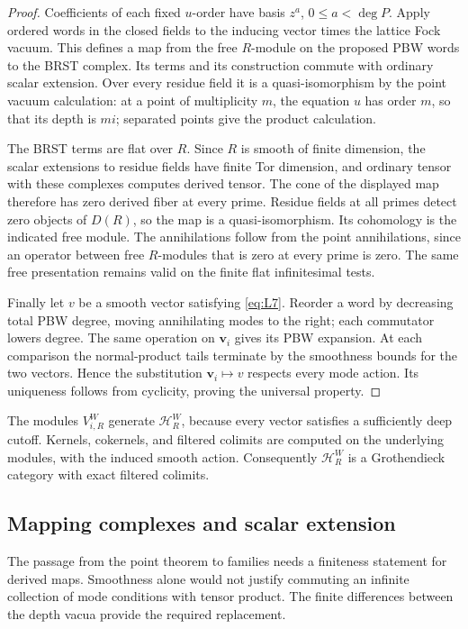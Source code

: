 \begin{proof}
Coefficients of each fixed \(u\)-order have basis
\(z^a\), \(0\leq a<\deg P\).  Apply ordered words in the closed
fields to the inducing vector times the lattice Fock vacuum.
This defines a map from the free \(R\)-module on the proposed PBW
words to the BRST complex.  Its terms and its construction commute
with ordinary scalar extension.  Over every residue field it is a
quasi-isomorphism by the point vacuum calculation: at a point of
multiplicity \(m\), the equation \(u\) has order \(m\), so that
its depth is \(mi\); separated points give the product calculation.

The BRST terms are flat over \(R\).  Since \(R\) is smooth of finite
dimension, the scalar extensions to residue fields have finite Tor
dimension, and ordinary tensor with these complexes computes derived
tensor.  The cone of the displayed map therefore has zero derived
fiber at every prime.  Residue fields at all primes detect zero
objects of \(D(R)\), so the map is a quasi-isomorphism.  Its
cohomology is the indicated free module.  The annihilations follow
from the point annihilations, since an operator between free
\(R\)-modules that is zero at every prime is zero.  The same free
presentation remains valid on the finite flat infinitesimal tests.

Finally let \(v\) be a smooth vector satisfying \eqref{eq:L7}.
Reorder a word by decreasing total PBW degree, moving annihilating
modes to the right; each commutator lowers degree.  The same operation
on \(\mathbf v_i\) gives its PBW expansion.  At each comparison the
normal-product tails terminate by the smoothness bounds for the two
vectors.  Hence the substitution \(\mathbf v_i\mapsto v\) respects
every mode action.  Its uniqueness follows from cyclicity, proving
the universal property.
\end{proof}

The modules \(V_{i,R}^W\) generate \(\mathcal H_R^W\), because every
vector satisfies a sufficiently deep cutoff.  Kernels, cokernels,
and filtered colimits are computed on the underlying modules, with
the induced smooth action.  Consequently \(\mathcal H_R^W\) is a
Grothendieck category with exact filtered colimits.

\subsection{Mapping complexes and scalar extension}

The passage from the point theorem to families needs a finiteness
statement for derived maps.  Smoothness alone would not justify
commuting an infinite collection of mode conditions with tensor
product.  The finite differences between the depth vacua provide
the required replacement.

